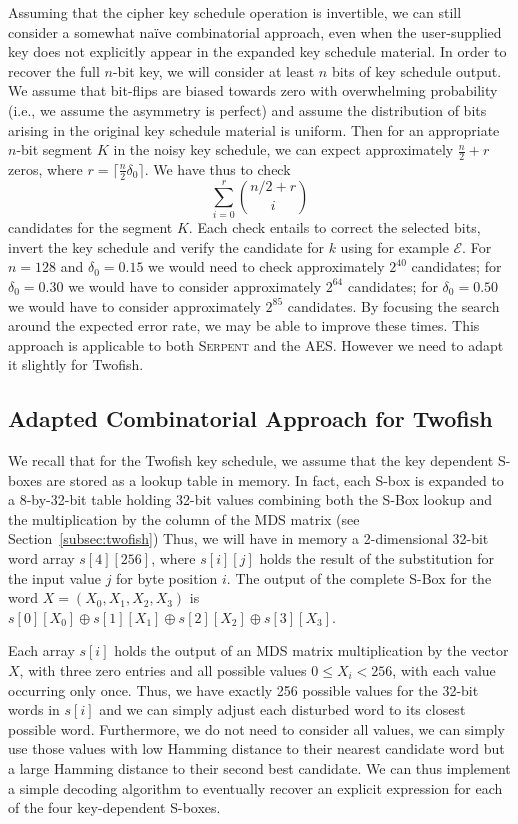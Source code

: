 \documentclass{llncs}
\newcommand{\Serpent}{\textsc{Serpent}\xspace}
\begin{document}
Assuming that the cipher key schedule operation is invertible, we can still consider a somewhat na\"ive combinatorial approach, even when the user-supplied key does not explicitly appear in the expanded key schedule material. In order to recover the full $n$-bit key, we will consider at least $n$ bits of key schedule output. We assume that bit-flips are biased towards zero with overwhelming probability (i.e., we assume the asymmetry is perfect) and assume the distribution of bits arising in the original key schedule material is uniform. Then for an appropriate $n$-bit segment $K$ in the noisy key schedule, we can expect approximately $\frac{n}{2} + r$ zeros, where $r = \lceil \frac{n}{2} \delta_0  \rceil$.
We have thus to check  $$\sum_{i=0}^{r} { n/2 + r \choose i }$$ candidates for the segment $K$. 
Each check entails to correct the selected bits, invert the key schedule and verify the candidate for $k$ using for example $\mathcal{E}$. For $n=128$ and $\delta_0 = 0.15$ we would need to check approximately  $2^{40}$ candidates; for $\delta_0 = 0.30$ we would have to consider approximately $2^{64}$ candidates; for $\delta_0 = 0.50$ we would have to consider approximately $2^{85}$ candidates. By focusing the search around the expected error rate, we may be able to improve these times. This approach is applicable to both \Serpent and the AES. However we need to adapt it slightly for Twofish.

\subsection{Adapted Combinatorial Approach for Twofish}
We recall that for the Twofish key schedule, we assume that the key dependent S-boxes are stored as a lookup table in memory. In fact, each S-box is expanded to a 8-by-32-bit table holding 32-bit values combining both the S-Box lookup and the multiplication by the column of the MDS matrix (see Section~\ref{subsec:twofish}) Thus, we will have in memory a 2-dimensional 32-bit word array $s[4][256]$, where $s[i][j]$ holds the result of the substitution for the input value $j$ for byte position $i$. The output of the complete S-Box for the word $X = (X_0,X_1,X_2,X_3)$ is $s[0][X_0] \oplus s[1][X_1] \oplus s[2][X_2] \oplus s[3][X_3]$. 

Each array $s[i]$ holds the output of an MDS matrix multiplication by the vector $X$, with three zero entries and all possible values $0 \leq X_i < 256$, with each value occurring only once. 
Thus, we have exactly 256 possible values for the 32-bit words in $s[i]$ and we can simply adjust each disturbed word to its closest possible word. Furthermore, we do not need to consider all values, we can simply use those values with low Hamming distance to their nearest candidate word but a large Hamming distance to their second best candidate. We can thus implement a simple decoding algorithm to eventually recover an explicit expression for each of the four key-dependent S-boxes.
\end{document}
